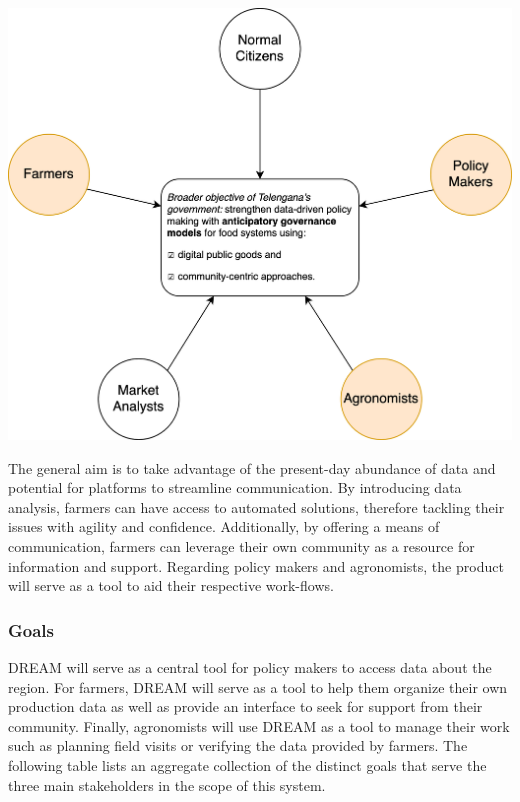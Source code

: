 \begin{flushleft}
\begin{center}
\includegraphics[scale=0.6]{../images_diagrams/stakeholders_in_broader_gov_objective.png}
\end{center}

The general aim is to take advantage of the present-day abundance of data and potential for platforms to streamline communication. By introducing data analysis, farmers can have access to automated solutions, therefore tackling their issues with agility and confidence. Additionally, by offering a means of communication, farmers can leverage their own community as a resource for information and support. Regarding policy makers and agronomists, the product will serve as a tool to aid their respective work-flows. 
\end{flushleft}

\subsubsection{Goals}

DREAM will serve as a central tool for policy makers to access data about the region. For farmers, DREAM will serve as a tool to help them organize their own production data as well as provide an interface to seek for support from their community. Finally, agronomists will use DREAM as a tool to manage their work such as planning field visits or verifying the data provided by farmers. The following table lists an aggregate collection of the distinct goals that serve the three main stakeholders in the scope of this system.

